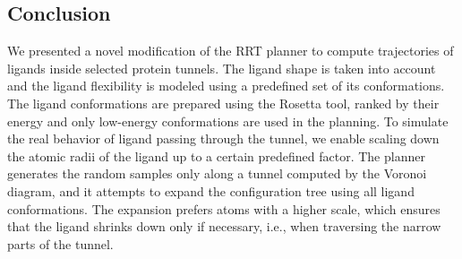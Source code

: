 \documentclass{bmcart}
\begin{document}
\subsection*{Conclusion}
We presented a novel modification of the RRT planner to compute trajectories of ligands inside selected protein tunnels.
The ligand shape is taken into account and the ligand flexibility is modeled using a predefined set of its conformations.
The ligand conformations are prepared using the Rosetta tool, ranked by their energy and only low-energy conformations are used in the planning.
To simulate the real behavior of ligand passing through the tunnel, we enable scaling down the atomic radii of the ligand up to a certain predefined factor.
The planner generates the random samples only along a tunnel computed by the Voronoi diagram, and it attempts to expand the configuration
tree using all ligand conformations. 
The expansion prefers atoms with a higher scale, which ensures that the ligand shrinks down only if necessary, i.e., when traversing the narrow parts of the tunnel.

\end{document}

